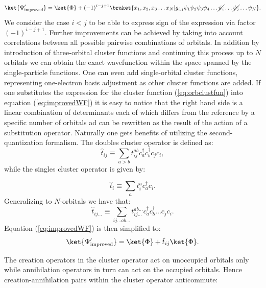\documentclass[twoside,english]{uiofysmaster}
\begin{document}
\begin{equation}\label{eq:improvedWF}
\ket{\Psi_{\text{improved}}^\prime} = \ket{\Phi} + (-1)^{i-j+1}\braket{x_1, x_2, x_3 \dots x_N|g_{i,j}\psi_1\psi_2\psi_3\psi_4 \dots \cancel{\psi_i} \dots \cancel{\psi_j} \dots \psi_N}.
\end{equation}
We consider the case $i<j$ to be able to express sign of the expression via factor $(-1)^{i-j+1}$.
Further improvements can be achieved by taking into account correlations between all possible pairwise combinations of orbitals. In addition by introduction of three-orbital cluster functions and continuing this process up to $N$ orbitals we can obtain the exact wavefunction within the space spanned by the single-particle functions. One can even add single-orbital cluster functions, representing one-electron basis adjustment as other cluster functions are added.
If one substitutes the expression for the cluster function (\ref{eq:orbclustfun}) into equation (\ref{eq:improvedWF}) it is easy to notice that the right hand side is a linear combination of determinants each of which differs from the reference by a specific number of orbitals ad can be rewritten as the result of the action of a substitution operator. Naturally one gets benefits of utilizing the second-quantization formalism. The doubles cluster operator is defined as:
\begin{equation*}
\hat{t}_{ij} \equiv \sum_{a>b}t_{ij}^{ab} c_a^\dag c_b^\dag c_j c_i,
\end{equation*}
while the singles cluster operator is given by:

\begin{equation*}
\hat{t}_{i} \equiv \sum_{a}t_{i}^{a} c_a^\dag c_i.
\end{equation*}
Generalizing to $N$-orbitals we have that:
\begin{equation*}
\hat{t}_{ij\dots} \equiv \sum_{ij\dots ab \dots}t_{ij\dots}^{ab\dots} c_a^\dag c_b^\dag \dots c_j c_i.
\end{equation*}
Equation (\ref{eq:improvedWF}) is then simplified to:
\begin{equation*}
\ket{\Psi_{\text{improved}}^\prime} =\ket{\Phi} + \hat{t}_{ij}\ket{\Phi}.
\end{equation*}

The creation operators in the cluster operator act on unoccupied orbitals only while annihilation operators in turn can act on the occupied orbitals. Hence creation-annihilation pairs within the cluster operator anticommute:
\end{document}
